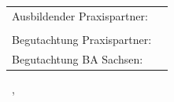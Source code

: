 \begin{titlepage}
\begin{spacing}{1}
		\vfill
		\vfill

		\begin{center}
			\begin{tabular}{ll}
				Ausbildender Praxispartner: & \myCompany        \\
				                            & \myCompanyAddress \\
				Begutachtung Praxispartner: & \myExpert         \\
				Begutachtung BA Sachsen:    & \myProf
			\end{tabular}
		\end{center}
	\end{spacing}
\end{titlepage}
\restoregeometry
\thispagestyle{empty}

\hfill

\vfill


\vfill

\noindent\footnotesize\textcopyright\ \mySubmissionDate, \myName
\endgroup